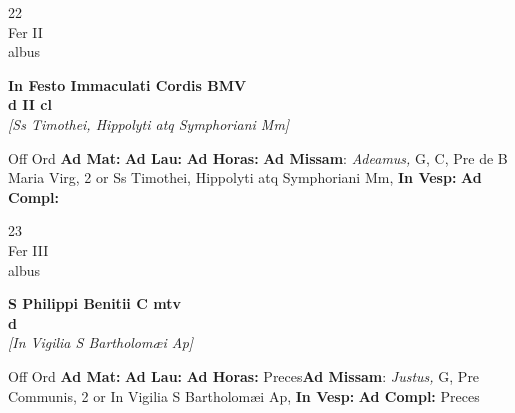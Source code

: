 \documentclass[10pt, openany]{book}
\begin{document}
        \begin{center}
            \begin{minipage}{3.5in}
                \vspace{2em}
                \begin{minipage}{0.5in}
                    {\Huge 22} \\
                    {\normalsize Fer II} \\
                    {\normalsize albus}
                \end{minipage}
                \begin{minipage}{3.0in}
                    \textbf{ \large In Festo Immaculati Cordis BMV \\
                    \textnormal{\normalsize d II cl}} \\ \textit{[Ss Timothei, Hippolyti atq Symphoriani Mm]} \\ 
                \end{minipage}
                \begin{justify}Off Ord
                    \textbf{Ad Mat: }
                    \textbf{Ad Lau: }
                    \textbf{Ad Horas: }\textbf{Ad Missam}: \textit{Adeamus,} G, C, Pre de B Maria Virg, 2 or Ss Timothei, Hippolyti atq Symphoriani Mm,  
                    \textbf{In Vesp: }
                    \textbf{Ad Compl: }
                \end{justify}
            \end{minipage}
        \end{center}
    
        \begin{center}
            \begin{minipage}{3.5in}
                \vspace{2em}
                \begin{minipage}{0.5in}
                    {\Huge 23} \\
                    {\normalsize Fer III} \\
                    {\normalsize albus}
                \end{minipage}
                \begin{minipage}{3.0in}
                    \textbf{ \large S Philippi Benitii C mtv \\
                    \textnormal{\normalsize d}} \\ \textit{[In Vigilia S Bartholomæi Ap]} \\ 
                \end{minipage}
                \begin{justify}Off Ord
                    \textbf{Ad Mat: }
                    \textbf{Ad Lau: }
                    \textbf{Ad Horas: }Preces\textbf{Ad Missam}: \textit{Justus,} G, Pre Communis, 2 or In Vigilia S Bartholomæi Ap,  
                    \textbf{In Vesp: }
                    \textbf{Ad Compl: }Preces
                \end{justify}
            \end{minipage}
        \end{center}
    
\end{document}
